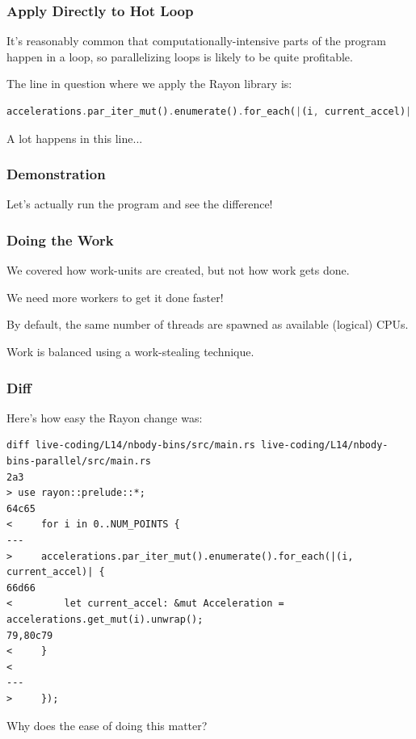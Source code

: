 \begin{frame}[fragile]
\frametitle{Apply Directly to Hot Loop}
It's reasonably common that computationally-intensive parts of the program happen in a loop, so parallelizing loops is likely to be quite profitable.

The line in question where we apply the Rayon library is:
\begin{lstlisting}[language=Rust]
accelerations.par_iter_mut().enumerate().for_each(|(i, current_accel)| {
\end{lstlisting}

A lot happens in this line...

\end{frame}


\begin{frame}
\frametitle{Demonstration}

Let's actually run the program and see the difference!

\end{frame}



\begin{frame}
\frametitle{Doing the Work}

We covered how work-units are created, but not how work gets done.

We need more workers to get it done faster!

By default, the same number of threads are spawned as available (logical) CPUs.

Work is balanced using a work-stealing technique.

\end{frame}


\begin{frame}[fragile]
\frametitle{Diff}

Here's how easy the Rayon change was:

{\scriptsize 
\begin{verbatim}
diff live-coding/L14/nbody-bins/src/main.rs live-coding/L14/nbody-bins-parallel/src/main.rs
2a3
> use rayon::prelude::*;
64c65
<     for i in 0..NUM_POINTS {
---
>     accelerations.par_iter_mut().enumerate().for_each(|(i, current_accel)| {
66d66
<         let current_accel: &mut Acceleration = accelerations.get_mut(i).unwrap();
79,80c79
<     }
< 
---
>     });
\end{verbatim}
}

Why does the ease of doing this matter? 

\end{frame}

